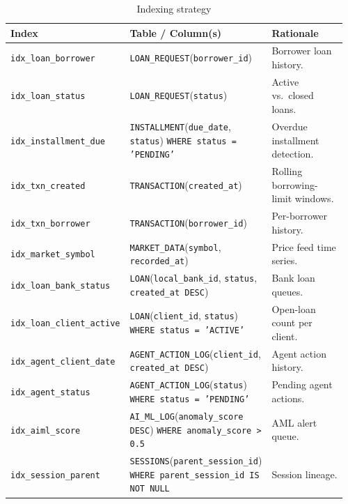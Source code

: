 \documentclass[12pt, a4paper]{report}
\newcommand{\tableheadcolor}{\rowcolor{TableHeadBg}}
\begin{document}
\begin{table}[H]
\centering
\caption[Indexing strategy]{Indexing strategy}
\label{tab:indexing-strategy}
\begingroup
\footnotesize
\setlength{\tabcolsep}{4pt}
\renewcommand{\arraystretch}{1.2}
\begin{tabular}{@{}%
 >{\raggedright\arraybackslash}p{0.19\linewidth}%
 >{\raggedright\arraybackslash}p{0.41\linewidth}%
 >{\raggedright\arraybackslash}p{0.36\linewidth}@{}}
\toprule
\tableheadcolor
\textbf{Index} & \textbf{Table / Column(s)} & \textbf{Rationale} \\
\midrule
\texttt{idx\_loan\_borrower} &
 \texttt{LOAN\_REQUEST}(\texttt{borrower\_id}) &
 Borrower loan history. \\
\texttt{idx\_loan\_status} &
 \texttt{LOAN\_REQUEST}(\texttt{status}) &
 Active vs.\ closed loans. \\
\texttt{idx\_installment\_due} &
 \texttt{INSTALLMENT}(\texttt{due\_date}, \texttt{status})\newline
 \texttt{WHERE status = 'PENDING'} &
 Overdue installment detection. \\
\texttt{idx\_txn\_created} &
 \texttt{TRANSACTION}(\texttt{created\_at}) &
 Rolling borrowing-limit windows. \\
\texttt{idx\_txn\_borrower} &
 \texttt{TRANSACTION}(\texttt{borrower\_id}) &
 Per-borrower history. \\
\texttt{idx\_market\_symbol} &
 \texttt{MARKET\_DATA}(\texttt{symbol},\newline
 \texttt{recorded\_at}) &
 Price feed time series. \\
\texttt{idx\_loan\_bank\_status} &
 \texttt{LOAN}(\texttt{local\_bank\_id}, \texttt{status},\newline
 \texttt{created\_at DESC}) &
 Bank loan queues. \\
\texttt{idx\_loan\_client\_active} &
 \texttt{LOAN}(\texttt{client\_id}, \texttt{status})\newline
 \texttt{WHERE status = 'ACTIVE'} &
 Open-loan count per client. \\
\texttt{idx\_agent\_client\_date} &
 \texttt{AGENT\_ACTION\_LOG}(\texttt{client\_id},\newline
 \texttt{created\_at DESC}) &
 Agent action history. \\
\texttt{idx\_agent\_status} &
 \texttt{AGENT\_ACTION\_LOG}(\texttt{status})\newline
 \texttt{WHERE status = 'PENDING'} &
 Pending agent actions. \\
\texttt{idx\_aiml\_score} &
 \texttt{AI\_ML\_LOG}(\texttt{anomaly\_score DESC})\newline
 \texttt{WHERE anomaly\_score > 0.5} &
 AML alert queue. \\
\texttt{idx\_session\_parent} &
 \texttt{SESSIONS}(\texttt{parent\_session\_id})\newline
 \texttt{WHERE parent\_session\_id IS NOT NULL} &
 Session lineage. \\
\bottomrule
\end{tabular}
\endgroup
\end{table}
\end{document}
